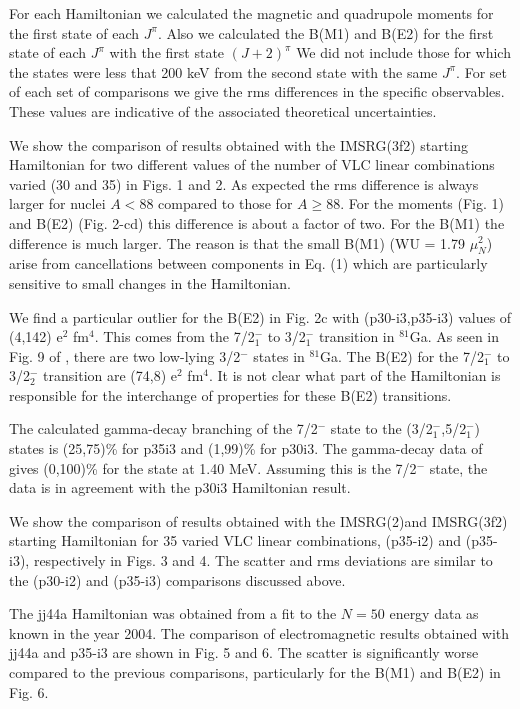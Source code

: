 \documentclass[aps,prl,twocolumn,tightenlines,superscriptaddress,showpacs]{revtex4-1}
\begin{document}
For each Hamiltonian we calculated the magnetic and quadrupole
moments for the first state of each $  J^{\pi }  $.
Also we calculated the B(M1) and B(E2) for the first state
of each $  J^{\pi }  $ with the first state $  (J+2)^{\pi }  $
We did not include those for which the states were less
that 200 keV from the second state with the same $  J^{\pi }  $.
For set of each set of comparisons we give the rms differences
in the specific observables. These values are
indicative of the associated theoretical uncertainties.

We show the comparison of results obtained with the IMSRG(3f2)
starting Hamiltonian for two different values of the
number of VLC linear combinations varied (30 and 35) in
Figs. 1 and 2. As expected the rms difference is
always larger for nuclei $  A<88  $ compared to those
for $  A \geq 88  $. For the moments (Fig. 1)
and B(E2) (Fig. 2-cd)
this difference is about a factor of two. For the
B(M1) the difference is much larger. The reason
is that the small B(M1) (WU = 1.79 $\mu_{N}^{2}$) arise from
cancellations between components in Eq. (1)
which  are particularly sensitive to small
changes in the Hamiltonian.

We find a particular outlier for the B(E2)
in Fig. 2c with (p30-i3,p35-i3) values of (4,142) e$^{2}$ fm$^{4}$.
This comes from the 7/2$_{1}^{-}$ to 3/2$_{1}^{-}$ transition in
$^{81}$Ga. As seen in Fig. 9 of \cite{p35i3}, there
are two low-lying 3/2$^{-}$ states in $^{81}$Ga.
The B(E2) for the 7/2$_{1}^{-}$ to 3/2$_{2}^{-}$ transition
are (74,8) e$^{2}$ fm$^{4}$. It is not clear what part
of the Hamiltonian is responsible for the
interchange of properties for these B(E2) transitions.

The calculated gamma-decay branching of the 7/2$^{-}$
state to the (3/2$^{-}_{1}$,5/2$^{-}_{1}$) states is (25,75)\%
for p35i3 and (1,99)\% for p30i3.
The gamma-decay data of \cite{ga81} gives
(0,100)\% for the state at 1.40 MeV. Assuming
this is the 7/2$^{-}$ state, the data is in agreement
with the p30i3 Hamiltonian result.






We show the comparison of results obtained with the
IMSRG(2)and IMSRG(3f2)
starting Hamiltonian for 35 varied VLC linear combinations,
(p35-i2) and (p35-i3), respectively in Figs. 3 and 4.
The scatter and rms deviations are similar to
the (p30-i2) and (p35-i3) comparisons discussed above.

The jj44a Hamiltonian \cite{jj44a} was obtained from a
fit to the $  N=50  $ energy data as known in the year 2004.
The comparison of electromagnetic results
obtained with jj44a and p35-i3 are shown in Fig. 5 and 6.
The scatter is significantly worse compared to the
previous comparisons, particularly for the B(M1) and
B(E2) in Fig. 6.
\end{document}
